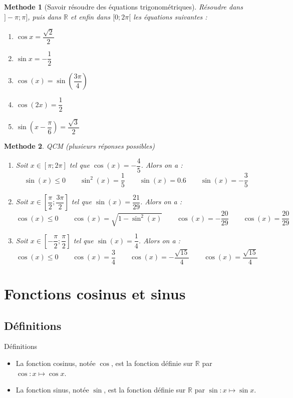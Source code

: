 \documentclass[10pt,a4paper]{article}
\def\R{{\mathbb R}}
\theoremstyle{break}
\newtheorem{Meth}{Methode}
\begin{document}
	\begin{Meth}[Savoir résoudre des équations trigonométriques]
		Résoudre dans $]-\pi; \pi]$, puis dans $\R$ et enfin dans $[0;2\pi[$ les équations suivantes :
		\begin{multicols}{4}
		\begin{enumerate}
			\item $\cos x = \dfrac{\sqrt{2}}{2} $
			\item $\sin x = -\dfrac{1}{2}$
			\item $\cos (x) = \sin\left(\dfrac{3\pi}{4}\right) $
			\item $\cos (2x) = \dfrac{1}{2}$ 
			
			\item $ \sin \left(x-\dfrac{\pi}{6}\right) = \dfrac{\sqrt{3}}{2}$ 
				
		\end{enumerate}
		\end{multicols}
				\end{Meth}
		\begin{Meth} QCM (plusieurs réponses possibles)
			\begin{enumerate}
				\item  Soit $x\in[\pi ; 2\pi]$ tel que $\cos(x)=-\dfrac45$. Alors on a :
				$$\sin(x) \leq 0 \qquad \sin^2(x)=\dfrac15 \qquad \sin(x)=0.6 \qquad \sin(x)=-\dfrac35$$
				\item  Soit $x\in\left[\dfrac{\pi}2 ; \dfrac{3\pi}2\right]$ tel que $\sin(x)=\dfrac{21}{29}$. Alors on a :
				$$\cos(x) \leq 0 \qquad \cos(x)=\sqrt{1-\sin^2(x)} \qquad \cos(x)=-\dfrac{20}{29} \qquad \cos(x)=\dfrac{20}{29}$$
				\item  Soit $x\in\left[-\dfrac{\pi}2 ; \dfrac{\pi}2\right]$ tel que $\sin(x)=\dfrac{1}{4}$. Alors on a :
				$$\cos(x) \leq 0 \qquad \cos(x)=\dfrac34 \qquad \cos(x)=-\dfrac{\sqrt{15}}{4} \qquad \cos(x)=\dfrac{\sqrt{15}}{4}$$
			
			
			\end{enumerate}
		
		\end{Meth}
	\newpage
	\section{Fonctions cosinus et sinus}
	\subsection{Définitions}
		\begin{bclogo}[couleur = red!25, arrondi = 0.1,logo=\bcbook]{Définitions}
	\begin{itemize}
		\item La fonction cosinus, notée $\cos$,  est la fonction définie sur $\mathbb{R}$ par $\cos : x\mapsto \cos x$.
		\item La fonction sinus, notée $\sin$,  est la fonction  définie sur $\mathbb{R}$ par $\sin : x\mapsto \sin x$.
	\end{itemize}
	\end{bclogo}
\end{document}
